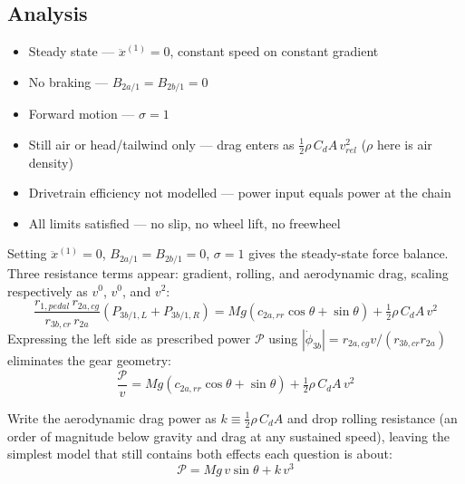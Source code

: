 \begin{aiblock}
\subsection{Analysis}

\begin{itemize}
    \item Steady state --- $\ddot{x}^{(1)} = 0$, constant speed on constant gradient
    \item No braking --- $B_{2a/1} = B_{2b/1} = 0$
    \item Forward motion --- $\sigma = 1$
    \item Still air or head/tailwind only --- drag enters as $\tfrac{1}{2}\rho\,C_dA\,v_{rel}^2$ ($\rho$ here is air density)
    \item Drivetrain efficiency not modelled --- power input equals power at the chain
    \item All limits satisfied --- no slip, no wheel lift, no freewheel
\end{itemize}

Setting $\ddot{x}^{(1)} = 0$, $B_{2a/1} = B_{2b/1} = 0$, $\sigma = 1$ gives the steady-state force balance. Three resistance terms appear: gradient, rolling, and aerodynamic drag, scaling respectively as $v^0$, $v^0$, and $v^2$:
\begin{equation}
    \frac{r_{1,pedal}\,r_{2a,cg}}{r_{3b,cr}\,r_{2a}}\left(P_{3b/1,L} + P_{3b/1,R}\right) = Mg\left(c_{2a,rr}\cos\theta + \sin\theta\right) + \tfrac{1}{2}\rho\,C_dA\,v^2
\end{equation}
Expressing the left side as prescribed power $\mathcal{P}$ using $|\dot{\phi}_{3b}| = r_{2a,cg}v/(r_{3b,cr}r_{2a})$ eliminates the gear geometry:
\begin{equation}
    \frac{\mathcal{P}}{v} = Mg\left(c_{2a,rr}\cos\theta + \sin\theta\right) + \tfrac{1}{2}\rho\,C_dA\,v^2
\end{equation}

Write the aerodynamic drag power as $k \equiv \tfrac{1}{2}\rho\,C_dA$ and drop rolling resistance
(an order of magnitude below gravity and drag at any sustained speed), leaving the simplest model
that still contains both effects each question is about:
\begin{equation}
    \mathcal{P} = Mg\,v\sin\theta + k\,v^3
\end{equation}


\end{aiblock}
